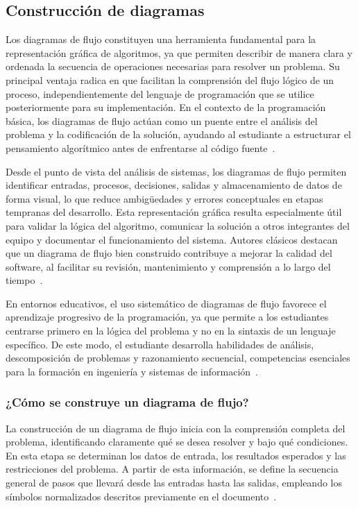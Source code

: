 \documentclass[12pt,twoside]{book}
\begin{document}
					
					\subsection{Construcción de diagramas}
						\noindent
						Los diagramas de flujo constituyen una herramienta fundamental para la representación gráfica de algoritmos, ya que permiten describir de manera clara y ordenada la secuencia de operaciones necesarias para resolver un problema. Su principal ventaja radica en que facilitan la comprensión del flujo lógico de un proceso, independientemente del lenguaje de programación que se utilice posteriormente para su implementación. En el contexto de la programación básica, los diagramas de flujo actúan como un puente entre el análisis del problema y la codificación de la solución, ayudando al estudiante a estructurar el pensamiento algorítmico antes de enfrentarse al código fuente~\cite{Joyanes2007Fundamentos,Manzano2017Programacion}.
						
						Desde el punto de vista del análisis de sistemas, los diagramas de flujo permiten identificar entradas, procesos, decisiones, salidas y almacenamiento de datos de forma visual, lo que reduce ambigüedades y errores conceptuales en etapas tempranas del desarrollo. Esta representación gráfica resulta especialmente útil para validar la lógica del algoritmo, comunicar la solución a otros integrantes del equipo y documentar el funcionamiento del sistema. Autores clásicos destacan que un diagrama de flujo bien construido contribuye a mejorar la calidad del software, al facilitar su revisión, mantenimiento y comprensión a lo largo del tiempo~\cite{Kendall2014Systems,Pressman2019Software}.
						
						En entornos educativos, el uso sistemático de diagramas de flujo favorece el aprendizaje progresivo de la programación, ya que permite a los estudiantes centrarse primero en la lógica del problema y no en la sintaxis de un lenguaje específico. De este modo, el estudiante desarrolla habilidades de análisis, descomposición de problemas y razonamiento secuencial, competencias esenciales para la formación en ingeniería y sistemas de información~\cite{Joyanes2007Fundamentos}.
						
						\subsubsection{¿Cómo se construye un diagrama de flujo?}
							\noindent
							La construcción de un diagrama de flujo inicia con la comprensión completa del problema, identificando claramente qué se desea resolver y bajo qué condiciones. En esta etapa se determinan los datos de entrada, los resultados esperados y las restricciones del problema. A partir de esta información, se define la secuencia general de pasos que llevará desde las entradas hasta las salidas, empleando los símbolos normalizados descritos previamente en el documento~\cite{Gaddis2022Starting,Farrell2018Programming,Hanly2015Problem}.
							
\end{document}
